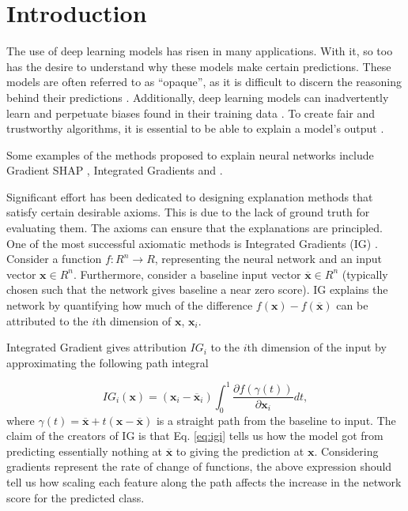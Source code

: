 \section{Introduction}
\label{sec:introduction}

The use of deep learning models has risen in many applications. With it, so too has the desire to understand why these models make certain predictions. These models are often referred to as ``opaque'', as it is difficult to discern the reasoning behind their predictions \citep{marcus2018deep}. Additionally, deep learning models can inadvertently learn and perpetuate biases found in their training data \citep{sap2019risk}. To create fair and trustworthy algorithms, it is essential to be able to explain a model's output \citep{das2020opportunities}. 

Some examples of the methods proposed to explain neural networks include Gradient SHAP \cite{lundberg2017unified}, Integrated Gradients  \citep{sundararajan2017axiomatic} and  \citep{kapishnikov2021guided}.

Significant effort has been dedicated to designing explanation methods that satisfy certain desirable axioms. This is due to the lack of ground truth for evaluating them. The axioms can ensure that the explanations are principled. One of the most successful axiomatic methods is Integrated Gradients (IG) \citep{sundararajan2017axiomatic}. Consider a function $f : R^n \to R$, representing the neural network and an input vector $\textbf{x} \in R^n$. Furthermore, consider a baseline input vector $\overline{\textbf{x}} \in R^n$ (typically chosen such that the network gives baseline a near zero score). IG explains the network by quantifying how much of the difference $f(\textbf{x}) - f(\overline{\textbf{x}})$ can be attributed to the $i$th dimension of $\textbf{x}$, $\textbf{x}_i$.


Integrated Gradient gives attribution $IG_i$ to the $i$th dimension of the input by approximating the following path integral

\begin{equation}
IG_i(\textbf{x}) = (\textbf{x}_i - \overline{\textbf{x}}_i) \int_0^1 \frac{\partial f(\gamma(t))}{\partial \textbf{x}_i} dt, \label{eq:igi}
\end{equation}
where $\gamma(t) = \overline{\textbf{x}} + t(\textbf{x} - \overline{\textbf{x}})$ is a straight path from the baseline to input. The claim of the creators of IG is that Eq. \ref{eq:igi} tells us how the model got from predicting essentially nothing at $\overline{\textbf{x}}$ to giving the prediction at $\textbf{x}$. Considering gradients represent the rate of change of functions, the above expression should tell us how scaling each feature along the path affects the increase in the network score for the predicted class.

